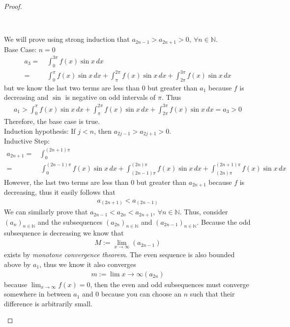 \documentclass[11pt]{article}
\newcommand{\N}{\mathbb{N}}
\newcommand{\nskip}{\\ \bigskip}
\newenvironment{myproof}
{\begin{proof} \begin{adjustwidth}{3em}{0pt}$ $\par\nobreak\ignorespaces}
{\end{adjustwidth} \end{proof}}
\begin{document}
\begin{flushleft}
\begin{myproof}
We will prove using strong induction that $a_{2n-1} > a_{2n+1} > 0, \ \forall n \in \N$. \nskip Base Case: $n=0$ 
\begin{align*}
a_3 = & \ \int_0^{3\pi} f(x) \sin x \,dx \\
= & \ \int_0^{\pi} f(x) \sin x \,dx + \int_\pi^{2\pi} f(x) \sin x \,dx + \int_{2\pi}^{3\pi} f(x) \sin x \,dx
\end{align*}
but we know the last two terms are less than 0 but greater than $a_1$ because $f$ is decreasing and $\sin$ is negative on odd intervals of $\pi$. Thus
\begin{align*}
a_1 > \int_0^{\pi} f(x) \sin x \,dx + \int_\pi^{2\pi} f(x) \sin x \,dx + \int_{2\pi}^{3\pi} f(x) \sin x \,dx  = a_3 > 0
\end{align*}
Therefore, the base case is true. \nskip
Induction hypothesis: If $j < n$, then $a_{2j-1} > a_{2j+1}> 0$. \nskip
Inductive Step: 
\begin{align*}
a_{2n+1} = & \ \int_0^{(2n+1)\pi} \\
= & \ \int_0^{(2n-1)\pi} f(x) \sin x \,dx + \int_{(2n-1)\pi}^{(2n)\pi} f(x) \sin x \,dx + \int_{(2n)\pi}^{(2n+1)\pi} f(x) \sin x \,dx 
\end{align*}
However, the last two terms are less than 0 but greater than $a_{2n+1}$ because $f$ is decreasing, thus it easily follows that 
\begin{align*}
a_{(2n+1)} < a_{(2n-1)}
\end{align*}
We can similarly prove that $a_{2n-1} < a_{2n} < a_{2n+1}, \ \forall n \in \N$. Thus, consider $(a_n)_{n \in \N}$ and the subsequences $(a_{2n})_{n \in \N}$ and $(a_{2n-1})_{n \in \N}$. Because the odd subsequence is decreasing we know that
\begin{align*}
M := \lim_{x \to \infty} (a_{2n-1})
\end{align*}
exists by \textit{monotone convergence theorem}. The even sequence is also bounded above by $a_1$, thus  we know it also converges
\begin{align*}
m := \lim{x \to \infty} (a_{2n})
\end{align*}
because $\lim_{x \to \infty} f(x) = 0$, then the even and odd subsequences must converge somewhere in between $a_1$ and 0 because you can choose an $n$ such that their difference is arbitrarily small.
\end{myproof}

\end{flushleft}
\end{document}
